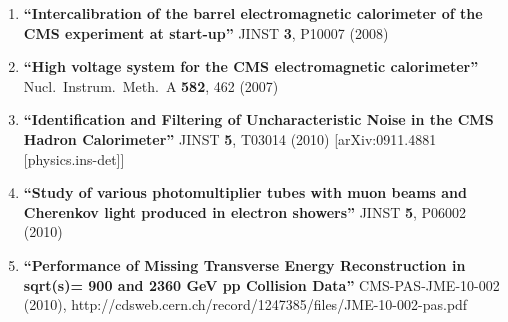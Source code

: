 \documentclass[10pt]{letter}
\begin{document}
\begin{enumerate}
\item%
{\bf ``Intercalibration of the barrel electromagnetic calorimeter of the CMS  experiment at start-up''}
  {}JINST {\bf 3}, P10007 (2008)

\item%
{\bf ``High voltage system for the CMS electromagnetic calorimeter''}
  {}Nucl.\ Instrum.\ Meth.\  A {\bf 582}, 462 (2007)

\item%
{\bf ``Identification and Filtering of Uncharacteristic Noise in the CMS Hadron Calorimeter''}
  {}JINST {\bf 5}, T03014 (2010)
  [arXiv:0911.4881 [physics.ins-det]]

\item%
{\bf ``Study of various photomultiplier tubes with muon beams and Cherenkov light produced in electron showers''}
  {}JINST {\bf 5}, P06002 (2010)

\item
{\bf ``Performance of Missing Transverse Energy Reconstruction in sqrt(s)= 900 and 2360 GeV pp Collision Data''}
{}CMS-PAS-JME-10-002 (2010), http://cdsweb.cern.ch/record/1247385/files/JME-10-002-pas.pdf



\end{enumerate}
\end{document}
